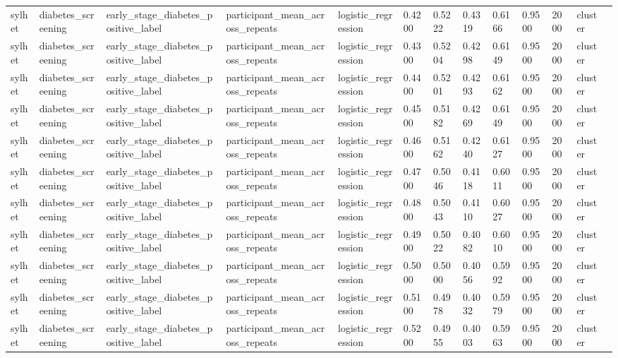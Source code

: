 \begin{tabular}{lllllllllllll}
sylhet & diabetes\_screening & early\_stage\_diabetes\_positive\_label & participant\_mean\_across\_repeats & logistic\_regression & 0.4200 & 0.5222 & 0.4319 & 0.6166 & 0.9500 & 2000 & cluster &  \\
sylhet & diabetes\_screening & early\_stage\_diabetes\_positive\_label & participant\_mean\_across\_repeats & logistic\_regression & 0.4300 & 0.5204 & 0.4298 & 0.6149 & 0.9500 & 2000 & cluster &  \\
sylhet & diabetes\_screening & early\_stage\_diabetes\_positive\_label & participant\_mean\_across\_repeats & logistic\_regression & 0.4400 & 0.5201 & 0.4293 & 0.6162 & 0.9500 & 2000 & cluster &  \\
sylhet & diabetes\_screening & early\_stage\_diabetes\_positive\_label & participant\_mean\_across\_repeats & logistic\_regression & 0.4500 & 0.5182 & 0.4269 & 0.6149 & 0.9500 & 2000 & cluster &  \\
sylhet & diabetes\_screening & early\_stage\_diabetes\_positive\_label & participant\_mean\_across\_repeats & logistic\_regression & 0.4600 & 0.5162 & 0.4240 & 0.6127 & 0.9500 & 2000 & cluster &  \\
sylhet & diabetes\_screening & early\_stage\_diabetes\_positive\_label & participant\_mean\_across\_repeats & logistic\_regression & 0.4700 & 0.5046 & 0.4118 & 0.6011 & 0.9500 & 2000 & cluster &  \\
sylhet & diabetes\_screening & early\_stage\_diabetes\_positive\_label & participant\_mean\_across\_repeats & logistic\_regression & 0.4800 & 0.5043 & 0.4110 & 0.6027 & 0.9500 & 2000 & cluster &  \\
sylhet & diabetes\_screening & early\_stage\_diabetes\_positive\_label & participant\_mean\_across\_repeats & logistic\_regression & 0.4900 & 0.5022 & 0.4082 & 0.6010 & 0.9500 & 2000 & cluster &  \\
sylhet & diabetes\_screening & early\_stage\_diabetes\_positive\_label & participant\_mean\_across\_repeats & logistic\_regression & 0.5000 & 0.5000 & 0.4056 & 0.5992 & 0.9500 & 2000 & cluster &  \\
sylhet & diabetes\_screening & early\_stage\_diabetes\_positive\_label & participant\_mean\_across\_repeats & logistic\_regression & 0.5100 & 0.4978 & 0.4032 & 0.5979 & 0.9500 & 2000 & cluster &  \\
sylhet & diabetes\_screening & early\_stage\_diabetes\_positive\_label & participant\_mean\_across\_repeats & logistic\_regression & 0.5200 & 0.4955 & 0.4003 & 0.5963 & 0.9500 & 2000 & cluster &  \\

\end{tabular}
